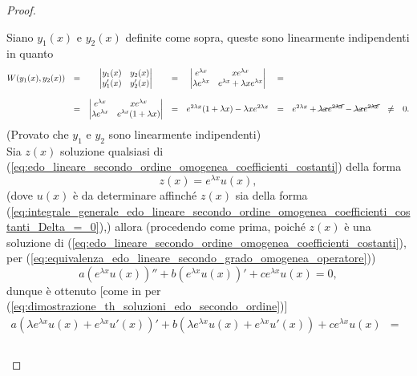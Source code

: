 \begin{proof}
\begin{enumerate}
		\noindent Siano $y_1(x)$ e $y_2(x)$ definite come sopra, queste sono linearmente indipendenti in quanto
		\begin{equation*}
			\begin{matrix}
				W(y_1(x),y_2(x)) &=&\begin{vmatrix}
					y_1(x) & y_2(x)\\
					y_1'(x) & y_2'(x)
				\end{vmatrix} &=&\begin{vmatrix}
					e^{\lambda x} & xe^{\lambda x}\\
					\lambda e^{\lambda x} & e^{\lambda  x} + \lambda x e^{\lambda x}
				\end{vmatrix} &=& \\\\
				&=&\begin{vmatrix}
					e^{\lambda x} & xe^{\lambda  x}\\
					\lambda  e^{\lambda x} &  e^{\lambda  x} (1 + \lambda x )
				\end{vmatrix} &=&
				 e^{2\lambda x}(1+\lambda x) - \lambda x e^{2\lambda x} &=& e^{2\lambda x} + \cancel{\lambda x e^{2\lambda x}} - \cancel{\lambda x e^{2\lambda x}} &\neq& 0.
			\end{matrix}
		\end{equation*}
		(Provato che $y_1$ e $y_2$ sono linearmente indipendenti)\\
		Sia $z(x)$ soluzione qualsiasi di (\ref{eq:edo_lineare_secondo_ordine_omogenea_coefficienti_costanti}) della forma 
		\begin{equation}\label{eq:integrale_generale_delta_=_0}
			z(x) = e^{\lambda x} u(x),
		\end{equation}
		(dove $u(x)$ è da determinare affinché $z(x)$ sia della forma (\ref{eq:integrale_generale_edo_lineare_secondo_ordine_omogenea_coefficienti_costanti_Delta_=_0}),) allora (procedendo come prima, poiché $z(x)$ è una soluzione di (\ref{eq:edo_lineare_secondo_ordine_omogenea_coefficienti_costanti}), per (\ref{eq:equivalenza_edo_lineare_secondo_grado_omogenea_operatore}))
		\begin{equation*}
			a(e^{\lambda x}u(x))'' + b(e^{\lambda x} u(x))' + c e^{\lambda x} u(x) = 0,
		\end{equation*}
		dunque è ottenuto [come in per (\ref{eq:dimostrazione_th_soluzioni_edo_secondo_ordine})]
		\begin{equation*}
			\begin{matrix}
				a(\lambda e^{\lambda x}u(x)+e^{\lambda x}u'(x))' + b(\lambda e^{\lambda x}u(x) + e^{\lambda x}u'(x)) + ce^{\lambda x}u(x) &=& \\\\

\end{matrix}
\end{equation*}
\end{enumerate}
\end{proof}
